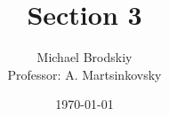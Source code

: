 


\title{Section 3}
\date{\today}
\author{Michael Brodskiy\\ \small Professor: A. Martsinkovsky}



\maketitle

\newpage

\tableofcontents

\newpage

